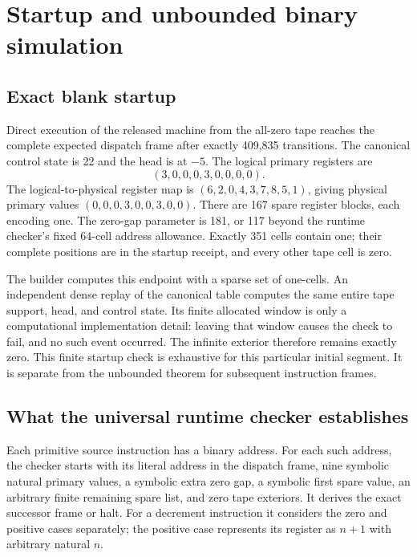 \section{Startup and unbounded binary simulation}
\label{sec:runtime}

\subsection{Exact blank startup}

Direct execution of the released machine from the all-zero tape reaches
the complete expected dispatch frame after exactly 409,835 transitions.
The canonical control state is 22 and the head is at $-5$. The logical
primary registers are
\[
                     (3,0,0,0,3,0,0,0,0).
\]
The logical-to-physical register map is
$(6,2,0,4,3,7,8,5,1)$, giving physical primary values
$(0,0,0,3,0,0,3,0,0)$. There are 167 spare register blocks, each
encoding one. The zero-gap parameter is 181, or 117 beyond the
runtime checker's fixed 64-cell address allowance. Exactly 351 cells
contain one; their complete positions are in the startup receipt, and
every other tape cell is zero.

The builder computes this endpoint with a sparse set of one-cells.
An independent dense replay of the canonical table computes the same
entire tape support, head, and control state. Its finite allocated
window is only a computational implementation detail: leaving that
window causes the check to fail, and no such event occurred. The
infinite exterior therefore remains exactly zero. This finite startup
check is exhaustive for this particular initial segment. It is separate
from the unbounded theorem for subsequent instruction frames.

\subsection{What the universal runtime checker establishes}

Each primitive source instruction has a binary address. For each such
address, the checker starts with its literal address in the dispatch
frame, nine symbolic natural primary values, a symbolic extra zero gap,
a symbolic first spare value, an arbitrary finite remaining spare list,
and zero tape exteriors. It derives the exact successor frame or halt.
For a decrement instruction it considers the zero and positive cases
separately; the positive case represents its register as $n+1$ with
arbitrary natural $n$.


